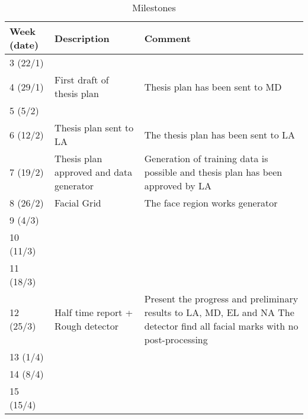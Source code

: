 \begin{table}[H]
\centering
\caption{Milestones}
\label{table:milestones}
\begin{tabular}{|p{}|p{}|p{}|}
	\hline
	\textbf{Week (date)} & \textbf{Description}                    & \textbf{Comment}                                                                                                                      \\ \hline
	3 (22/1)             &                                         &  \\ \hline
	4 (29/1)             & First draft of thesis plan              & Thesis plan has been sent to MD                                                                                                       \\ \hline
	5 (5/2)              &                                         &  \\ \hline
	6 (12/2)             & Thesis plan sent to LA                  & The thesis plan has been sent to LA                                                                                                   \\ \hline
	7 (19/2)             & Thesis plan approved and data generator & Generation of training data is possible and thesis plan has been approved by LA                                                       \\ \hline
	8 (26/2)             & Facial Grid                             & The face region works generator                                                                                                       \\ \hline
	9 (4/3)              &                                         &  \\ \hline
	10 (11/3)            &                                         &  \\ \hline
	11 (18/3)            &                                         &  \\ \hline
	12 (25/3)            & Half time report + Rough detector       & Present the progress and preliminary results to LA, MD, EL and NA \newline The detector find all facial marks with no post-processing \\ \hline
	13 (1/4)             &                                         &  \\ \hline
	14 (8/4)             &                                       &  \\ \hline
	15 (15/4)            &                                       &  \\ \hline

\end{tabular}
\end{table}
